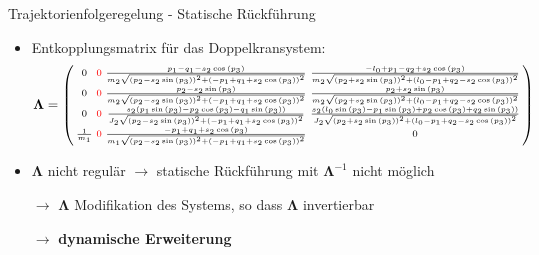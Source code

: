 \documentclass[
	ngerman,
	10pt,				%
	aspectratio=169, 	%
	xcolor=dvipsnames
]{beamer}
\begin{document}

\begin{frame}[t,fragile,label=trajektorienregelung_4]{\large Trajektorienfolgeregelung - Statische Rückführung}
	
	\begin{itemize}
		\item Entkopplungsmatrix für das Doppelkransystem:
		\begin{align*}
			\boldsymbol{\Lambda} = 
			\left(\begin{smallmatrix}
				0 & \textcolor{red}{0} & \frac{p_{1} - q_{1} - s_{2} \cos{\left(p_{3} \right)}}{m_{2} \sqrt{\left(p_{2} - 	s_{2} \sin{\left(p_{3} \right)}\right)^{2} + \left(- p_{1} + q_{1} + s_{2} \cos{\left(p_{3} \right)}\right)^{2}}} & \frac{- l_{0} + p_{1} - q_{2} + s_{2} \cos{\left(p_{3} \right)}}{m_{2} \sqrt{\left(p_{2} + s_{2} \sin{\left(p_{3} \right)}\right)^{2} + \left(l_{0} - p_{1} + q_{2} - s_{2} \cos{\left(p_{3} \right)}\right)^{2}}}\\
				0 & \textcolor{red}{0} & \frac{p_{2} - s_{2} \sin{\left(p_{3} \right)}}{m_{2} \sqrt{\left(p_{2} - s_{2} 	\sin{\left(p_{3} \right)}\right)^{2} + \left(- p_{1} + q_{1} + s_{2} \cos{\left(p_{3} \right)}\right)^{2}}} & \frac{p_{2} + s_{2} \sin{\left(p_{3} \right)}}{m_{2} \sqrt{\left(p_{2} + s_{2} \sin{\left(p_{3} \right)}\right)^{2} + \left(l_{0} - p_{1} + q_{2} - s_{2} \cos{\left(p_{3} \right)}\right)^{2}}}\\
				0 & \textcolor{red}{0} & \frac{s_{2} \left(p_{1} \sin{\left(p_{3} \right)} - p_{2} \cos{\left(p_{3} \right)} - 	q_{1} \sin{\left(p_{3} \right)}\right)}{J_{2} \sqrt{\left(p_{2} - s_{2} \sin{\left(p_{3} \right)}\right)^{2} + \left(- p_{1} + q_{1} + s_{2} \cos{\left(p_{3} \right)}\right)^{2}}} & \frac{s_{2} \left(l_{0} \sin{\left(p_{3} \right)} - p_{1} \sin{\left(p_{3} \right)} + p_{2} \cos{\left(p_{3} \right)} + q_{2} \sin{\left(p_{3} \right)}\right)}{J_{2} \sqrt{\left(p_{2} + s_{2} \sin{\left(p_{3} \right)}\right)^{2} + \left(l_{0} - p_{1} + q_{2} - s_{2} \cos{\left(p_{3} \right)}\right)^{2}}}\\
				\frac{1}{m_{1}} & \textcolor{red}{0} & \frac{- p_{1} + q_{1} + s_{2} \cos{\left(p_{3} \right)}}{m_{1} 	\sqrt{\left(p_{2} - s_{2} \sin{\left(p_{3} \right)}\right)^{2} + \left(- p_{1} + q_{1} + s_{2} \cos{\left(p_{3} \right)}\right)^{2}}} & 0
			\end{smallmatrix}\right)
		\end{align*}
		\pause
		\item $\boldsymbol{\Lambda}$ nicht regulär $\rightarrow$ statische Rückführung mit $\boldsymbol{\Lambda}^{-1}$ nicht möglich
		\pause
		\item[$\rightarrow$] $\boldsymbol{\Lambda}$ Modifikation des Systems, so dass $\boldsymbol{\Lambda}$ invertierbar
		\pause
		\item[$\rightarrow$] \textbf{dynamische Erweiterung}
	\end{itemize}


\end{frame}
\end{document}
